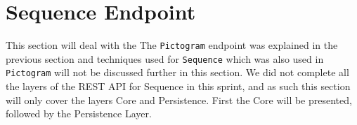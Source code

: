 \section{Sequence Endpoint}\label{sec:sequence_endpoint_sprint3}
This section will deal with the  
The \texttt{Pictogram} endpoint was explained in the previous section and techniques used for \texttt{Sequence} which was also used in \texttt{Pictogram} will not be discussed further in this section.
We did not complete all the layers of the REST API for Sequence in this sprint, and as such this section will only cover the layers Core and Persistence.
First the Core will be presented, followed by the Persistence Layer.